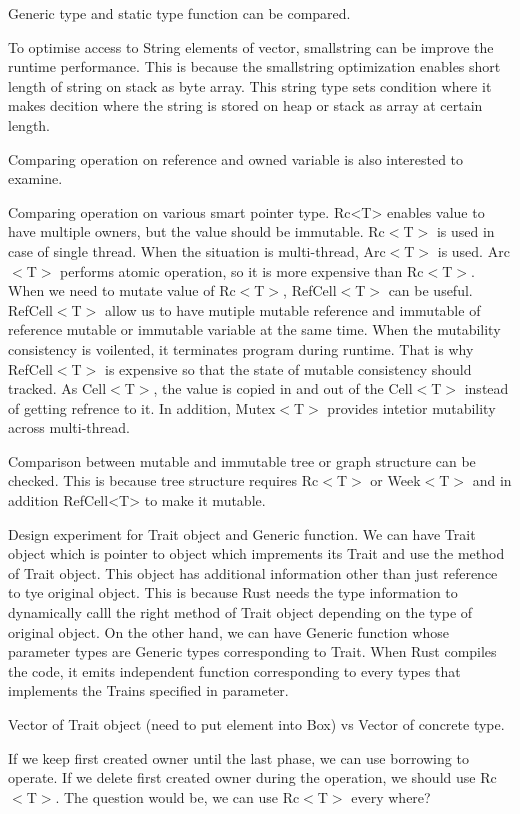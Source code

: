 Generic type and static type function can be compared. 

To optimise access to String elements of vector, smallstring can be improve the runtime performance. 
This is because the smallstring optimization enables short length of string on stack as byte array. 
This string type sets condition where it makes decition where the string is stored on heap or stack as array at certain length.

Comparing operation on reference and owned variable is also interested to examine.

Comparing operation on various smart pointer type. 
Rc<T> enables value to have multiple owners, but the value should be immutable. Rc$<$T$>$ is used in case of single thread. 
When the situation is multi-thread, Arc$<$T$>$ is used. Arc$<$T$>$ performs atomic operation, so it is more expensive than Rc$<$T$>$. 
When we need to mutate value of Rc$<$T$>$, RefCell$<$T$>$ can be useful. RefCell$<$T$>$ allow us to have mutiple mutable reference and immutable
of reference mutable or immutable variable at the same time. When the mutability consistency is voilented, it terminates program during runtime. 
That is why RefCell$<$T$>$ is expensive so that the state of mutable consistency should tracked. 
As Cell$<$T$>$, the value is copied in and out of the Cell$<$T$>$ instead of getting refrence to it. 
In addition, Mutex$<$T$>$ provides intetior mutability across multi-thread.

Comparison between mutable and immutable tree or graph structure can be checked. 
This is because tree structure requires Rc$<$T$>$ or Week$<$T$>$ and in addition RefCell<T> to make it mutable.

Design experiment for Trait object and Generic function. 
We can have Trait object which is pointer to object which imprements its Trait and use the method of Trait object.
This object has additional information other than just reference to tye original object. 
This is because Rust needs the type information to dynamically calll the right method of Trait object depending on the type of 
original object.
On the other hand, we can have Generic function whose parameter types are Generic types corresponding to Trait. 
When Rust compiles the code, it emits independent function corresponding to every types that implements the Trains specified in parameter.

Vector of Trait object (need to put element into Box) vs Vector of concrete type.


If we keep first created owner until the last phase, we can use borrowing to operate.
If we delete first created owner during the operation, we should use Rc$<$T$>$.
The question would be, we can use Rc$<$T$>$ every where?

